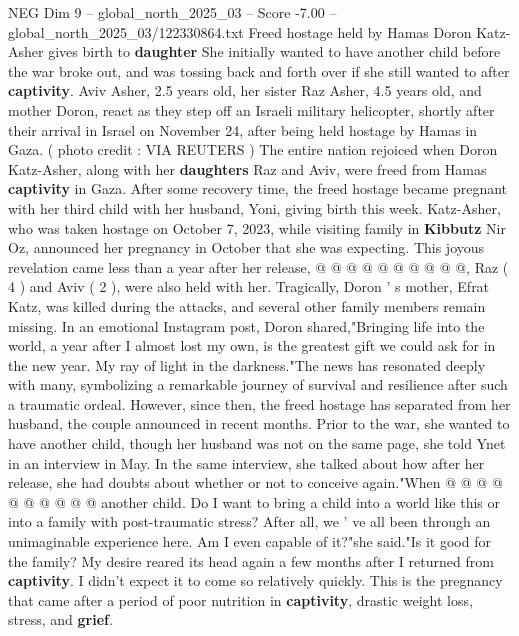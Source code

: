 \begin{textsample}{NEG Dim 9 – global\_north\_2025\_03 – Score -7.00 – global\_north\_2025\_03/122330864.txt}  \label{ex:f9_neg_150}
Freed hostage held by Hamas Doron Katz-Asher gives birth to \textbf{daughter} She initially wanted to have another child before the war broke out, and was tossing back and forth over if she still wanted to after \textbf{captivity}.
Aviv Asher, 2.5 years old, her sister Raz Asher, 4.5 years old, and mother Doron, react as they step off an Israeli military helicopter, shortly after their arrival in Israel on November 24, after being held hostage by Hamas in Gaza. ( photo credit : VIA REUTERS ) The entire nation rejoiced when Doron Katz-Asher, along with her \textbf{daughters} Raz and Aviv, were freed from Hamas \textbf{captivity} in Gaza.
After some recovery time, the freed hostage became pregnant with her third child with her husband, Yoni, giving birth this week.
Katz-Asher, who was taken hostage on October 7, 2023, while visiting family in \textbf{Kibbutz} Nir Oz, announced her pregnancy in October that she was expecting.
This joyous revelation came less than a year after her release, @ @ @ @ @ @ @ @ @ @, Raz ( 4 ) and Aviv ( 2 ), were also held with her.
Tragically, Doron ' s mother, Efrat Katz, was killed during the attacks, and several other family members remain missing.
In an emotional Instagram post, Doron shared,"Bringing life into the world, a year after I almost lost my own, is the greatest gift we could ask for in the new year.
My ray of light in the darkness."The news has resonated deeply with many, symbolizing a remarkable journey of survival and resilience after such a traumatic ordeal.
However, since then, the freed hostage has separated from her husband, the couple announced in recent months.
Prior to the war, she wanted to have another child, though her husband was not on the same page, she told Ynet in an interview in May.
In the same interview, she talked about how after her release, she had doubts about whether or not to conceive again."When @ @ @ @ @ @ @ @ @ @ another child.
Do I want to bring a child into a world like this or into a family with post-traumatic stress?
After all, we ' ve all been through an unimaginable experience here.
Am I even capable of it?"she said."Is it good for the family?
My desire reared its head again a few months after I returned from \textbf{captivity}.
I didn't expect it to come so relatively quickly.
This is the pregnancy that came after a period of poor nutrition in \textbf{captivity}, drastic weight loss, stress, and \textbf{grief}.

\end{textsample}

